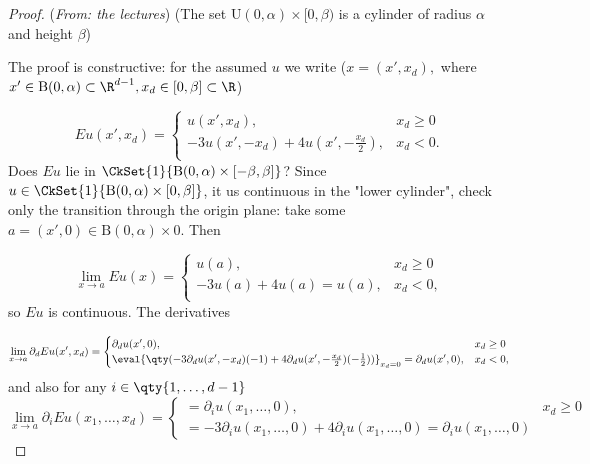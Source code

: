 \begin{proof}(\textit{From: the lectures})
	(The set $\text{U}(0,\alpha) \times [0,\beta)$ is a cylinder of radius $\alpha$ and height $\beta$)

	The proof is constructive: for the assumed $u$ we write ($x = (x',x_d),$ where $x' \in \text{B}(0,\alpha) \subset \R^{d-1}, x_d \in [0,\beta] \subset \R$)

	\begin{equation*}
		Eu(x',x_d) = 
		\begin{cases}
			u(x',x_d),& x_d \geq 0 \\
			-3u(x',-x_d) + 4u(x' ,-\frac{x_d}{2}) ,& x_d < 0.\\
		\end{cases}
	\end{equation*}
	Does $Eu$ lie in $\CkSet{1}{\text{B}(0,\alpha)\times [-\beta, \beta]}$? Since $u \in \CkSet{1}{\text{B}(0,\alpha)\times [0,\beta]}$, it us continuous in the "lower cylinder", check only the transition through the origin plane: take some $a=(x',0) \in \text{B}(0,\alpha)\times \qty{0}$. Then

	\begin{equation*}
		\lim_{x \to a} Eu(x) = 
		\begin{cases}
			u(a), & x_d \geq 0 \\
			-3u(a)+ 4u(a) = u(a), & x_d<0, \\
		\end{cases}
	\end{equation*}
	so $Eu$ is continuous. The derivatives 

	\begin{equation*}
		\lim_{x\to a}\partial_{d} Eu(x',x_d) = 
		\begin{cases}
			\partial_{d}u(x', 0) ,& x_d \geq 0 \\
			\eval{\qty(-3 \partial_{d} u (x',-x_d)(-1) + 4 \partial_{d}u(x',-\frac{x_d}{2}) (-\frac{1}{2}))}_{x_d = 0} = \partial_{d} u(x', 0),& x_d<0,\\
		\end{cases}
	\end{equation*}
	and also for any $i \in \qty{1, \dots, d-1}$ 
	\begin{equation*}
	  \lim_{x\to a}\partial_{i} Eu(x_1, \dots, x_d) = 
	  \begin{cases}
		  = \partial_{i} u (x_1, \dots, 0) , & x_d \geq 0 \\
		  = -3 \partial_{i} u(x_1, \dots, 0) + 4 \partial_{i} u(x_1, \dots, 0) = \partial_{i} u(x_1, \dots, 0)
	  \end{cases}
	\end{equation*}
	

\end{proof}
